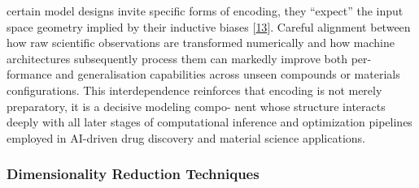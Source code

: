 \documentclass[
]{article}
\begin{document}
certain model designs invite specific forms of encoding, they ``expect''
the input space geometry implied by their inductive biases
{[}\protect\hyperlink{_bookmark53}{13}{]}. Careful alignment between how
raw scientific observations are transformed numerically and how machine
architectures subsequently process them can markedly improve both per-
formance and generalisation capabilities across unseen compounds or
materials configurations. This interdependence reinforces that encoding
is not merely preparatory, it is a decisive modeling compo- nent whose
structure interacts deeply with all later stages of computational
inference and optimization pipelines employed in AI-driven drug
discovery and material science applications.

\hypertarget{dimensionality-reduction-techniques}{%
\subsubsection{Dimensionality Reduction
Techniques}\label{dimensionality-reduction-techniques}}
\end{document}
